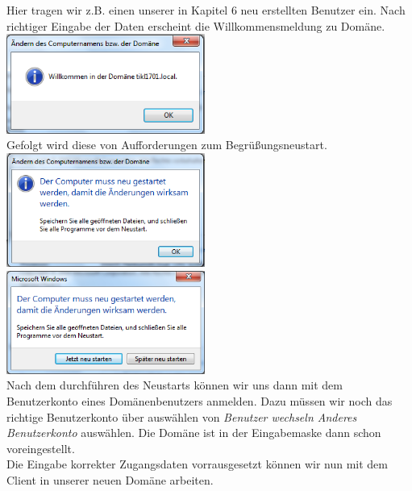 \documentclass[12pt,a4paper,titlepage]{scrartcl} %
\begin{document}
Hier tragen wir z.B. einen unserer in Kapitel 6 neu erstellten Benutzer ein. Nach richtiger Eingabe der Daten erscheint die Willkommensmeldung zu Domäne.\\

	\includegraphics[width=6.5cm]{Bilder/Client/Client05}\\
	
Gefolgt wird diese von Aufforderungen zum Begrüßungsneustart.\\

	\includegraphics[width=6.5cm]{Bilder/Client/Client06}\\
	
	\includegraphics[width=6.5cm]{Bilder/Client/Client07}\\

Nach dem durchführen des Neustarts können wir uns dann mit dem Benutzerkonto eines Domänenbenutzers anmelden. Dazu müssen wir noch das richtige Benutzerkonto über auswählen von \emph{Benutzer wechseln  Anderes Benutzerkonto} auswählen. Die Domäne ist in der Eingabemaske dann schon voreingestellt.\\
Die Eingabe korrekter Zugangsdaten vorrausgesetzt können wir nun mit dem Client in unserer neuen Domäne arbeiten.
\end{document}
